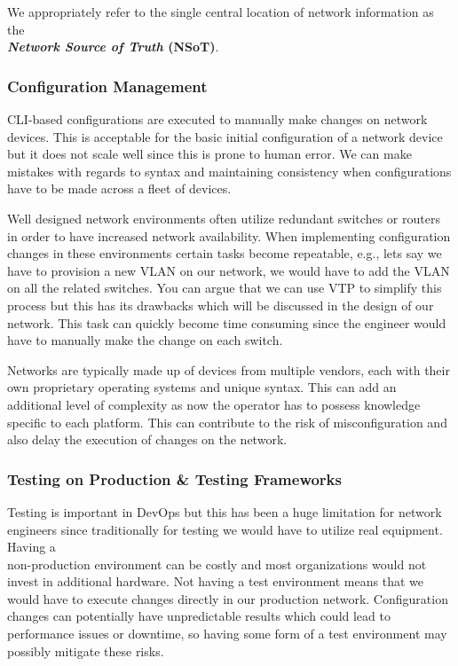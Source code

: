 \documentclass[12pt, letterpaper]{article}
\begin{document}
\smallskip

We appropriately refer to the single central location of network information as the
 \\ \textbf{\textit{Network Source of Truth} (NSoT)}.
	
	\subsubsection{Configuration Management}
CLI-based configurations are executed to manually make changes on network devices. This is acceptable for the basic initial configuration of a network device but it does not scale well since this is prone to human error. We can make mistakes with regards to syntax and maintaining consistency when configurations have to be made across a fleet of devices. 

\smallskip

Well designed network environments often utilize redundant switches or routers in order to have increased network availability. When implementing configuration changes in these environments certain tasks become repeatable, e.g., lets say we have to provision a new VLAN on our network, we would have to add the VLAN on all the related switches. You can argue that we can use VTP to simplify this process but this has its drawbacks which will be discussed in the design of our network. This task can quickly become time consuming since the engineer would have to manually make the change on each switch.

\smallskip

Networks are typically made up of devices from multiple vendors, each with their own proprietary operating systems and unique syntax. This can add an additional level of complexity as now the operator has to possess knowledge specific to each platform. This can contribute to the risk of misconfiguration and also delay the execution of changes on the network.   
	
	
	\subsubsection{Testing on Production \& Testing Frameworks}
Testing is important in DevOps but this has been a huge limitation for network engineers since traditionally for testing we would have to utilize real equipment. Having a \\ non-production environment can be costly and most organizations would not invest in additional hardware. Not having a test environment means that we would have to execute changes directly in our production network. Configuration changes can potentially have unpredictable results which could lead to performance issues or downtime, so having some form of a test environment may possibly mitigate these risks.
\end{document}
